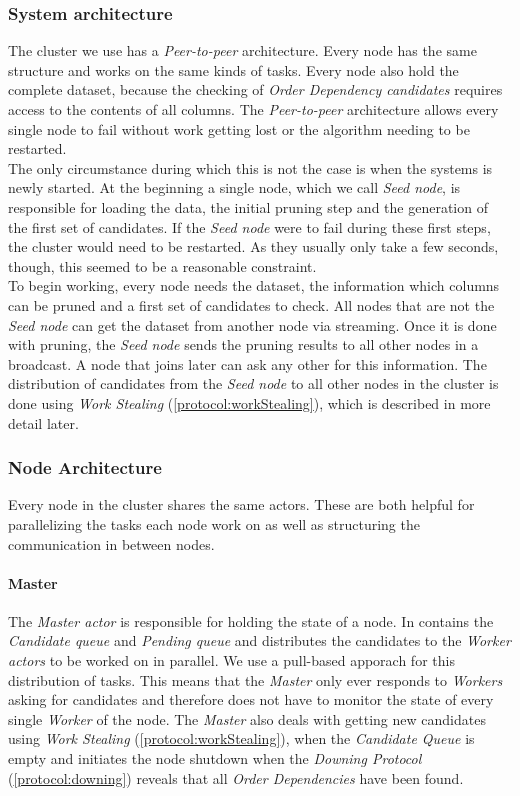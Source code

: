 \subsubsection{System architecture}
The cluster we use has a \emph{Peer-to-peer} architecture.
Every node has the same structure and works on the same kinds of tasks.
Every node also hold the complete dataset, because the checking of \emph{Order Dependency candidates} requires access to the contents of all columns.  
The \emph{Peer-to-peer} architecture allows every single node to fail without work getting lost or the algorithm needing to be restarted. \\
The only circumstance during which this is not the case is when the systems is newly started. 
At the beginning a single node, which we call \emph{Seed node}, is responsible for loading the data, the initial pruning step and the generation of the first set of candidates. 
If the \emph{Seed node} were to fail during these first steps, the cluster would need to be restarted. 
As they usually only take a few seconds, though, this seemed to be a reasonable constraint.\\
To begin working, every node needs the dataset, the information which columns can be pruned and a first set of candidates to check. 
All nodes that are not the \emph{Seed node} can get the dataset from another node via streaming. 
Once it is done with pruning, the \emph{Seed node} sends the pruning results to all other nodes in a broadcast.
A node that joins later can ask any other for this information.
The distribution of candidates from the \emph{Seed node} to all other nodes in the cluster is done using \emph{Work Stealing} (\ref{protocol:workStealing}), which is described in more detail later.

\subsubsection{Node Architecture}
Every node in the cluster shares the same actors.
These are both helpful for parallelizing the tasks each node work on as well as structuring the communication in between nodes.
\paragraph{Master} 
The \emph{Master actor} is responsible for holding the state of a node.
In contains the \emph{Candidate queue} and \emph{Pending queue} and distributes the candidates to the \emph{Worker actors} to be worked on in parallel. 
We use a pull-based apporach for this distribution of tasks.
This means that the \emph{Master} only ever responds to \emph{Workers} asking for candidates and therefore does not have to monitor the state of every single \emph{Worker} of the node.
The \emph{Master} also deals with getting new candidates using \emph{Work Stealing} (\ref{protocol:workStealing}), when the \emph{Candidate Queue} is empty and initiates the node shutdown when the \emph{Downing Protocol} (\ref{protocol:downing}) reveals that all \emph{Order Dependencies} have been found.

